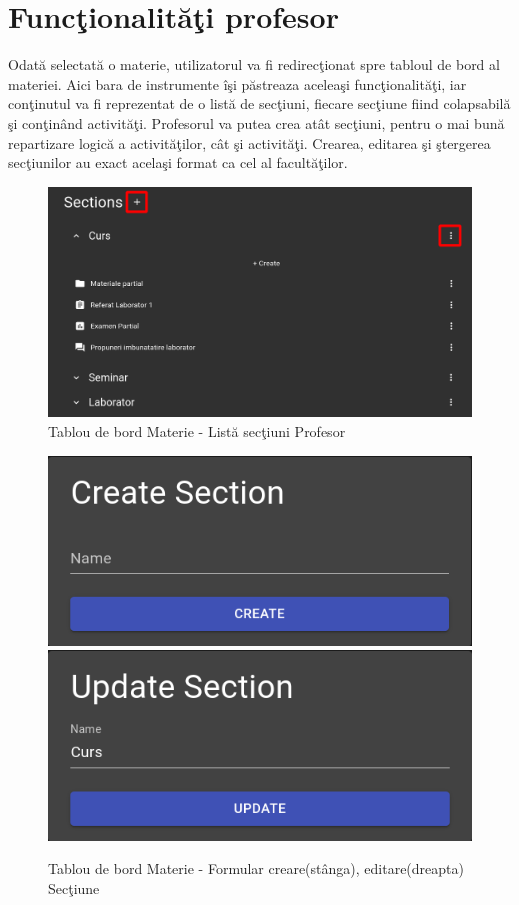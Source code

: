 \documentclass[12pt, a4paper, oneside, romanian]{teza-upb}
\begin{document}
\section{Funcţionalităţi profesor}

Odată selectată o materie, utilizatorul va fi redirecţionat spre tabloul de bord al materiei. Aici bara de instrumente îşi păstreaza aceleaşi funcţionalităţi, iar conţinutul va fi reprezentat de o listă de secţiuni, fiecare secţiune fiind colapsabilă şi conţinând activităţi. Profesorul va putea crea atât secţiuni, pentru o mai bună repartizare logică a activităţilor, cât şi activităţi. Crearea, editarea şi ştergerea secţiunilor au exact acelaşi format ca cel al facultăţilor.

\begin{figure}[H]
\centering
\includegraphics*[width=\columnwidth]{tablou-de-bord-materie-lista-sectiuni-profesor}
\caption{Tablou de bord Materie - Listă secţiuni Profesor}
\label{tablou-de-bord-materie-lista-sectiuni-profesor}
\end{figure}

\begin{figure}[H]
\centering
\includegraphics*[width=0.45\columnwidth]{tablou-de-bord-materie-formular-creare-sectiune}
\includegraphics*[width=0.45\columnwidth]{tablou-de-bord-materie-formular-editare-sectiune}
\caption{Tablou de bord Materie - Formular creare(stânga), editare(dreapta) Secţiune}
\label{tablou-de-bord-materie-formular-sectiune}
\end{figure}
\end{document}
